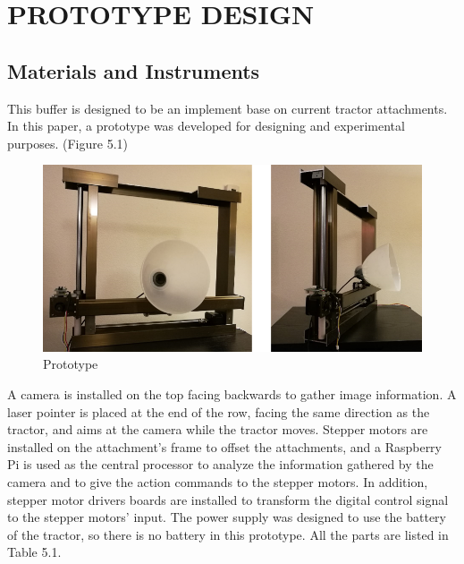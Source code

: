 \chapter{PROTOTYPE DESIGN}


\section{Materials and Instruments}
This buffer is designed to be an implement base on current tractor attachments. In this paper, a prototype was developed for designing and experimental purposes. (Figure 5.1) 
\begin{figure}[ht!]
\begin{center}
\includegraphics[scale = 0.6]{pics/prototype.png}
\caption{Prototype}
\end{center}
\end{figure}
A camera is installed on the top facing backwards to gather image information. A laser pointer is placed at the end of the row, facing the same direction as the tractor,  and aims at the camera while the tractor moves. Stepper motors are installed on the attachment's frame to offset the attachments, and a Raspberry Pi is used as the central processor to analyze the information gathered by the camera and to give the action commands to the stepper motors. In addition, stepper motor drivers boards are installed to transform the digital control signal to the stepper motors' input. The power supply was designed to use the battery of the tractor, so there is no battery in this prototype. All the parts are listed in Table 5.1.


